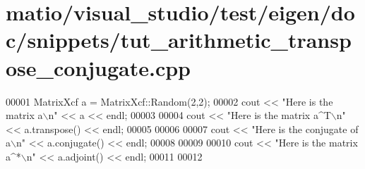 \hypertarget{matio_2visual__studio_2test_2eigen_2doc_2snippets_2tut__arithmetic__transpose__conjugate_8cpp_source}{}\section{matio/visual\+\_\+studio/test/eigen/doc/snippets/tut\+\_\+arithmetic\+\_\+transpose\+\_\+conjugate.cpp}
\label{matio_2visual__studio_2test_2eigen_2doc_2snippets_2tut__arithmetic__transpose__conjugate_8cpp_source}

\begin{DoxyCode}
00001 MatrixXcf a = MatrixXcf::Random(2,2);
00002 cout << \textcolor{stringliteral}{"Here is the matrix a\(\backslash\)n"} << a << endl;
00003 
00004 cout << \textcolor{stringliteral}{"Here is the matrix a^T\(\backslash\)n"} << a.transpose() << endl;
00005 
00006 
00007 cout << \textcolor{stringliteral}{"Here is the conjugate of a\(\backslash\)n"} << a.conjugate() << endl;
00008 
00009 
00010 cout << \textcolor{stringliteral}{"Here is the matrix a^*\(\backslash\)n"} << a.adjoint() << endl;
00011 
00012 
\end{DoxyCode}

